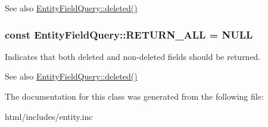 \begin{DoxySeeAlso}{See also}
\hyperlink{classEntityFieldQuery_a49543cc7ea0841ba46d4ebe310695ce3}{EntityFieldQuery::deleted()} 
\end{DoxySeeAlso}
\hypertarget{classEntityFieldQuery_a1d63c58e6b1d99e6034d96875305fe0d}{
\subsubsection[{RETURN\_\-ALL}]{\setlength{\rightskip}{0pt plus 5cm}const {\bf EntityFieldQuery::RETURN\_\-ALL} = NULL}}
\label{classEntityFieldQuery_a1d63c58e6b1d99e6034d96875305fe0d}
Indicates that both deleted and non-\/deleted fields should be returned.

\begin{DoxySeeAlso}{See also}
\hyperlink{classEntityFieldQuery_a49543cc7ea0841ba46d4ebe310695ce3}{EntityFieldQuery::deleted()} 
\end{DoxySeeAlso}


The documentation for this class was generated from the following file:\begin{DoxyCompactItemize}
\item 
html/includes/entity.inc\end{DoxyCompactItemize}
